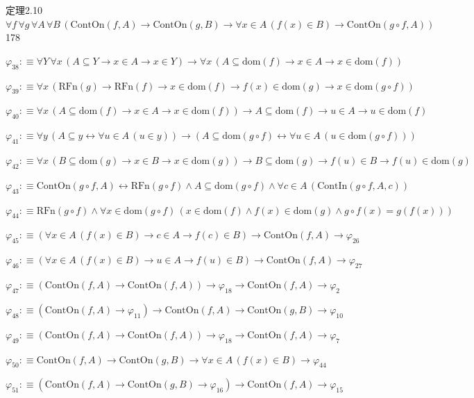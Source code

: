 \begin{fullproof}{定理2.10}{$\forall f\,\forall g\,\forall A\,\forall B\,(\mathrm{ContOn}(f,A) \to \mathrm{ContOn}(g,B) \to \forall x \in A\,(f(x) \in B) \to \mathrm{ContOn}(g \circ f,A))$}{178}
\begin{abbrevlist}
\item $\varphi_{38} :\equiv \forall Y\,\forall x\,(A \subseteq Y \to x \in A \to x \in Y) \to \forall x\,(A \subseteq \mathrm{dom}(f) \to x \in A \to x \in \mathrm{dom}(f))$
\item $\varphi_{39} :\equiv \forall x\,(\mathrm{RFn}(g) \to \mathrm{RFn}(f) \to x \in \mathrm{dom}(f) \to f(x) \in \mathrm{dom}(g) \to x \in \mathrm{dom}(g \circ f))$
\item $\varphi_{40} :\equiv \forall x\,(A \subseteq \mathrm{dom}(f) \to x \in A \to x \in \mathrm{dom}(f)) \to A \subseteq \mathrm{dom}(f) \to u \in A \to u \in \mathrm{dom}(f)$
\item $\varphi_{41} :\equiv \forall y\,(A \subseteq y \leftrightarrow \forall u \in A\,(u \in y)) \to (A \subseteq \mathrm{dom}(g \circ f) \leftrightarrow \forall u \in A\,(u \in \mathrm{dom}(g \circ f)))$
\item $\varphi_{42} :\equiv \forall x\,(B \subseteq \mathrm{dom}(g) \to x \in B \to x \in \mathrm{dom}(g)) \to B \subseteq \mathrm{dom}(g) \to f(u) \in B \to f(u) \in \mathrm{dom}(g)$
\item $\varphi_{43} :\equiv \mathrm{ContOn}(g \circ f,A) \leftrightarrow \mathrm{RFn}(g \circ f) \land A \subseteq \mathrm{dom}(g \circ f) \land \forall c \in A\,(\mathrm{ContIn}(g \circ f,A,c))$
\item $\varphi_{44} :\equiv \mathrm{RFn}(g \circ f) \land \forall x \in \mathrm{dom}(g \circ f)\,(x \in \mathrm{dom}(f) \land f(x) \in \mathrm{dom}(g) \land g \circ f(x) = g(f(x)))$
\item $\varphi_{45} :\equiv (\forall x \in A\,(f(x) \in B) \to c \in A \to f(c) \in B) \to \mathrm{ContOn}(f,A) \to \varphi_{26}$
\item $\varphi_{46} :\equiv (\forall x \in A\,(f(x) \in B) \to u \in A \to f(u) \in B) \to \mathrm{ContOn}(f,A) \to \varphi_{27}$
\item $\varphi_{47} :\equiv (\mathrm{ContOn}(f,A) \to \mathrm{ContOn}(f,A)) \to \varphi_{18} \to \mathrm{ContOn}(f,A) \to \varphi_{2}$
\item $\varphi_{48} :\equiv (\mathrm{ContOn}(f,A) \to \varphi_{11}) \to \mathrm{ContOn}(f,A) \to \mathrm{ContOn}(g,B) \to \varphi_{10}$
\item $\varphi_{49} :\equiv (\mathrm{ContOn}(f,A) \to \mathrm{ContOn}(f,A)) \to \varphi_{18} \to \mathrm{ContOn}(f,A) \to \varphi_{7}$
\item $\varphi_{50} :\equiv \mathrm{ContOn}(f,A) \to \mathrm{ContOn}(g,B) \to \forall x \in A\,(f(x) \in B) \to \varphi_{44}$
\item $\varphi_{51} :\equiv (\mathrm{ContOn}(f,A) \to \mathrm{ContOn}(g,B) \to \varphi_{16}) \to \mathrm{ContOn}(f,A) \to \varphi_{15}$

\end{abbrevlist}
\end{fullproof}
